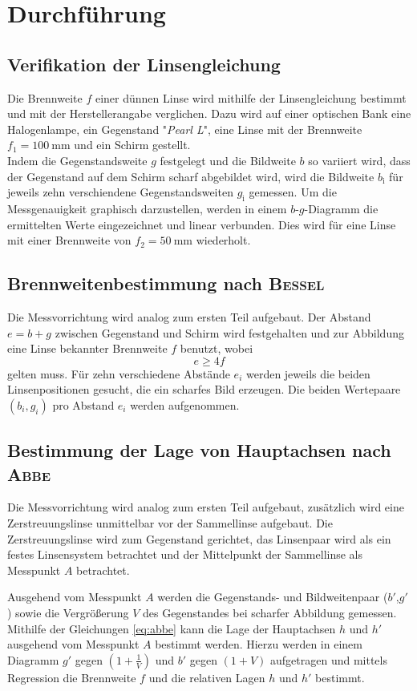 \section{Durchführung}
\label{sec:Durchfuehrung}
\subsection{Verifikation der Linsengleichung}
Die Brennweite $f$ einer dünnen Linse wird mithilfe der Linsengleichung bestimmt und mit der Herstellerangabe verglichen.
Dazu wird auf einer optischen Bank eine Halogenlampe, ein Gegenstand "\emph{Pearl L}",  eine Linse mit der Brennweite $f_1=\SI{100}{\milli\meter}$ und ein Schirm gestellt. \\
Indem die Gegenstandsweite $g$ festgelegt und die Bildweite $b$ so variiert wird, dass der Gegenstand auf dem Schirm scharf abgebildet wird, wird die Bildweite $b_\text{i}$ für jeweils zehn verschiendene Gegenstandsweiten $g_\text{i}$ gemessen.
Um die Messgenauigkeit graphisch darzustellen, werden in einem $b$-$g$-Diagramm die ermittelten Werte eingezeichnet und linear verbunden.
Dies wird für eine Linse mit einer Brennweite von $f_2=\SI{50}{\milli\meter}$ wiederholt.


\subsection{Brennweitenbestimmung nach \textsc{Bessel}}
Die Messvorrichtung wird analog zum ersten Teil aufgebaut.
Der Abstand \\$e=b+g$ zwischen Gegenstand und Schirm wird festgehalten und zur Abbildung eine Linse bekannter Brennweite $f$ benutzt, wobei 
\begin{equation}
	e\ge4f
\end{equation}
gelten muss.
Für zehn verschiedene Abstände $e_i$ werden jeweils die beiden Linsenpositionen gesucht, die ein scharfes Bild erzeugen. 
Die beiden Wertepaare $(b_i,g_i)$ pro Abstand $e_i$ werden aufgenommen.

\subsection{Bestimmung der Lage von Hauptachsen nach \textsc{Abbe}}
Die Messvorrichtung wird analog zum ersten Teil aufgebaut, zusätzlich wird eine Zerstreuungslinse unmittelbar vor der Sammellinse aufgebaut.
Die Zerstreuungslinse wird zum Gegenstand gerichtet, das Linsenpaar wird als ein festes Linsensystem betrachtet und der Mittelpunkt der Sammellinse als Messpunkt $A$ betrachtet.

Ausgehend vom Messpunkt $A$ werden die Gegenstands- und Bildweitenpaar ($b'$,$g'$) sowie die Vergrößerung $V$ des Gegenstandes bei scharfer Abbildung gemessen. Mithilfe der Gleichungen \eqref{eq:abbe} kann die Lage der Hauptachsen $h$ und $h'$ ausgehend vom Messpunkt $A$ bestimmt werden.
Hierzu werden in einem Diagramm
$g′$ gegen $(1+\frac{1}{V})$ und $b′$ gegen $(1+V)$ aufgetragen und mittels Regression die Brennweite $f$ und die relativen Lagen $h$ und $h'$ bestimmt.

\newpage